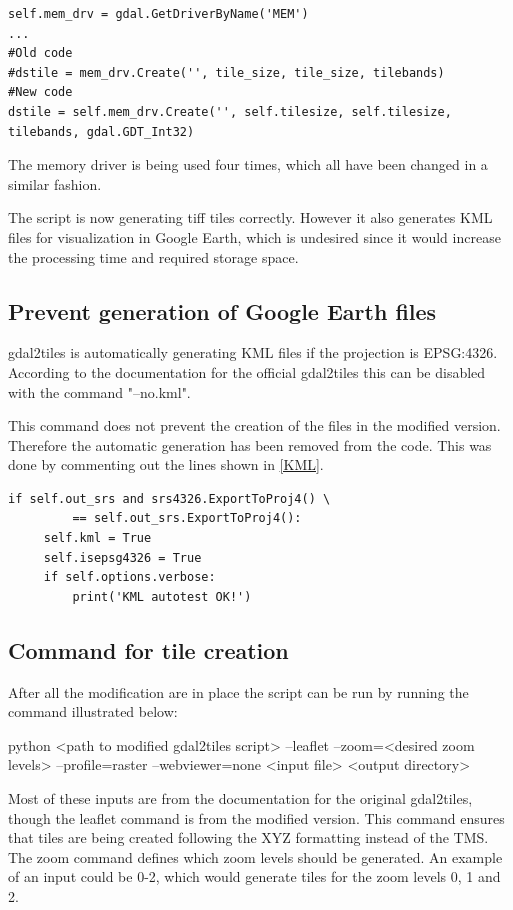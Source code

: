 \begin{lstlisting}[language=iPython, caption={Increasing the bit depth}, label= bitdepthBoost,escapechar=|]
self.mem_drv = gdal.GetDriverByName('MEM')
...
#Old code
#dstile = mem_drv.Create('', tile_size, tile_size, tilebands)
#New code
dstile = self.mem_drv.Create('', self.tilesize, self.tilesize, tilebands, gdal.GDT_Int32)
\end{lstlisting}
The memory driver is being used four times, which all have been changed in a similar fashion.


The script is now generating tiff tiles correctly. However it also generates KML files for visualization in Google Earth, which is undesired since it would increase the processing time and required storage space. 
\subsection{Prevent generation of Google Earth files}
gdal2tiles is automatically generating KML files if the projection is EPSG:4326. According to the documentation for the official gdal2tiles this can be disabled with the command "--no.kml".
\citep{gdal2tilesDoc}


This command does not prevent the creation of the files in the modified version. Therefore the automatic generation has been removed from the code. This was done by commenting out the lines shown in \ref{KML}. 

\begin{lstlisting}[language=iPython, caption={Preventing KML files from being created}, label= KML,escapechar=|]
 if self.out_srs and srs4326.ExportToProj4() \
         == self.out_srs.ExportToProj4():
     self.kml = True
     self.isepsg4326 = True
     if self.options.verbose:
         print('KML autotest OK!')
\end{lstlisting}
        
\subsection{Command for tile creation}\label{g2tCommand}

After all the modification are in place the script can be run by running the command illustrated below:


python <path to modified gdal2tiles script> --leaflet --zoom=<desired zoom levels> --profile=raster --webviewer=none <input file> <output directory>
\fxnote{Gør noget ved den her}

Most of these inputs are from the documentation for the original gdal2tiles, though the leaflet command is from the modified version. This command ensures that tiles are being created following the XYZ formatting instead of the TMS. The zoom command defines which zoom levels should be generated. An example of an input could be 0-2, which would generate tiles for the zoom levels 0, 1 and 2. 

